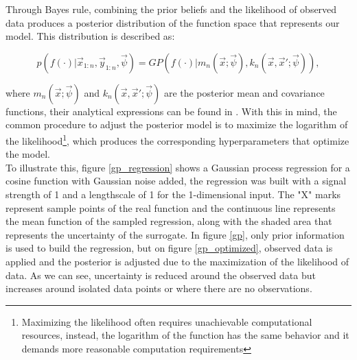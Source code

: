 \documentclass{article}
\begin{document}
Through Bayes rule, combining the prior beliefs and the likelihood of observed data produces a posterior distribution of the function space that represents our model. This distribution is described as\cite{Pandita2016}:

\begin{equation}
    p(f(\cdot)|\vec{x}_{1:n},\vec{y}_{1:n},\vec{\psi}) = GP(f(\cdot)|m_n(\vec{x};\vec{\psi}),k_n(\vec{x},\vec{x}';\vec{\psi})),
\end{equation}

where $m_n(\vec{x};\vec{\psi})$ and $k_n(\vec{x},\vec{x}';\vec{\psi})$ are the posterior mean and covariance functions, their analytical expressions can be found in \cite{Pandita2016}. With this in mind, the common procedure to adjust the posterior model is to maximize the logarithm of the likelihood\footnote{Maximizing the likelihood often requires unachievable computational resources, instead, the logarithm of the function has the same behavior and it demands more reasonable computation requirements}, which produces the corresponding hyperparameters that optimize the model.\\

To illustrate this, figure \ref{gp_regression} shows a Gaussian process regression for a cosine function with Gaussian noise added, the regression was built with a signal strength of 1 and a lengthscale of 1 for the 1-dimensional input. The "X" marks represent sample points of the real function and the continuous line represents the mean function of the sampled regression, along with the shaded area that represents the uncertainty of the surrogate. In figure \ref{gp}, only prior information is used to build the regression, but on figure \ref{gp_optimized}, observed data is applied and the posterior is adjusted due to the maximization of the likelihood of data. As we can see, uncertainty is reduced around the observed data but increases around isolated data points or where there are no observations.
\end{document}
